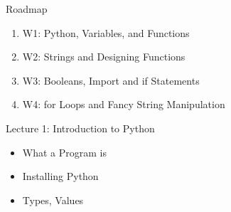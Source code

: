 \documentclass[14 pt]{beamer}
\let\olditem\item
\renewcommand{\item}{\olditem\vspace{4pt}}
\newcommand{\Alert}[1]{\textcolor{Alert}{#1}} %
\begin{document}
\begin{frame}{Roadmap}
  \begin{enumerate}
[circle]
  \item \Alert{W1: Python, Variables, and Functions}
  \item W2: Strings and Designing Functions
  \item W3: Booleans, Import and if Statements
  \item W4: for Loops and Fancy String Manipulation
  \end{enumerate}
  \begin{block}{Lecture 1: Introduction to Python}
      \begin{itemize}
  \item What a Program is
  \item  Installing Python
  \item Types, Values
  \end{itemize}
  \end{block}
\end{frame}
\end{document}
